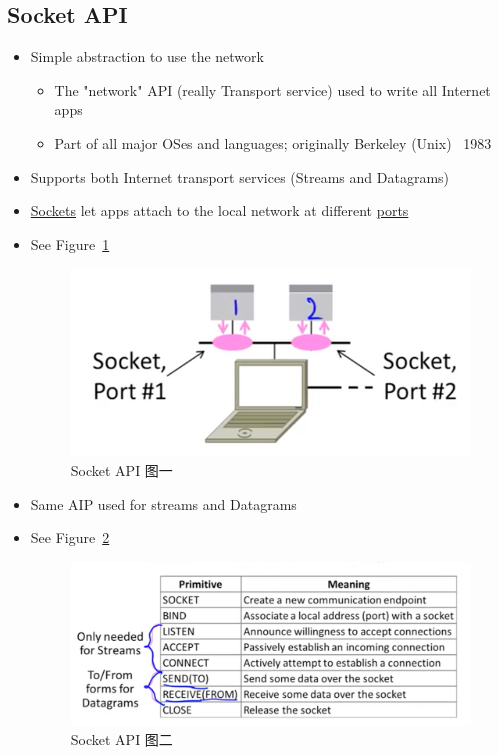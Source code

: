 \documentclass[12pt]{ctexart}   %
\begin{document}
	\subsection{Socket API}
	\begin{itemize}
		\item Simple abstraction to use the network
		\begin{itemize}
			\item The "network" API (really Transport service) used to write all Internet apps
			\item Part of all major OSes and languages; originally Berkeley (Unix) ~1983
		\end{itemize}
		
		\item Supports both Internet transport services (Streams and Datagrams)
		
		\item \underline{Sockets} let apps attach to the local network at different \underline{ports}
		\item See Figure~\ref{fig:6-1-5}
		 
		 \begin{figure}[h!] %
		\centering
		 \includegraphics[scale=0.7]{images/6-1-5}
		\caption{ Socket API 图一}
		 \label{fig:6-1-5}
		 \end{figure}
		 
		 \item Same AIP used for streams and Datagrams
		 \item See Figure~\ref{fig:6-1-6}
		 
		 \begin{figure}[h!] %
		\centering
		 \includegraphics[scale=0.7]{images/6-1-6}
		\caption{ Socket API 图二}
		 \label{fig:6-1-6}
		 \end{figure}
		
	\end{itemize}
	
\end{document}
